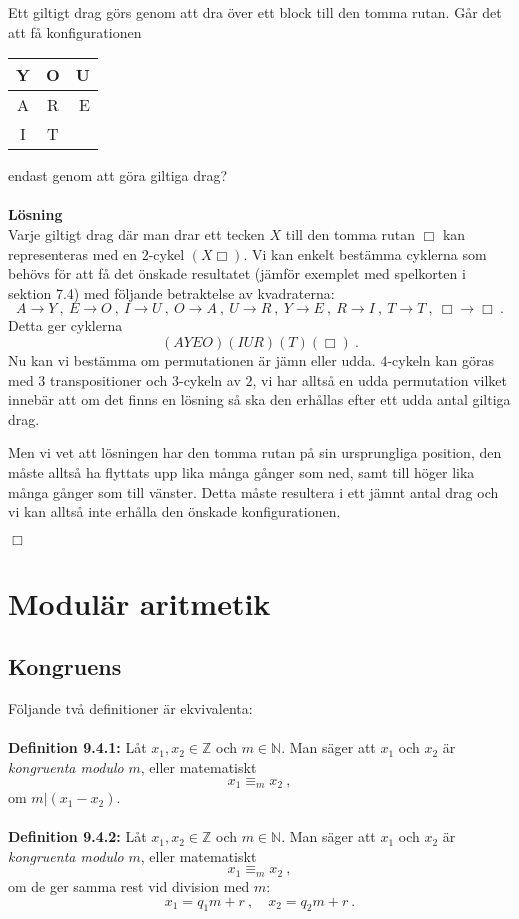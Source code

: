 \documentclass{article}
\begin{document}
Ett giltigt drag görs genom att dra över ett block till den tomma rutan. Går det att få konfigurationen
\begin{center}
\begin{tabular}{| c | c | r |}
\hline
Y & O & U
\\ \hline
A & R & E
\\ \hline
I & T &
\\ \hline
\end{tabular}
\end{center}
endast genom att göra giltiga drag?
\\ \\
\textbf{Lösning}
\\
Varje giltigt drag där man drar ett tecken $X$ till den tomma rutan $\Box$ kan representeras med en $2$-cykel $(X\Box)$. Vi kan enkelt bestämma cyklerna som behövs för att få det önskade resultatet (jämför exemplet med spelkorten i sektion 7.4) med följande betraktelse av kvadraterna:
$$
A\rightarrow Y \ , \ E\rightarrow O \ , \ I\rightarrow U \ , \ O\rightarrow A \ , \ U\rightarrow R \ , \ Y\rightarrow E \ , \ R\rightarrow I \ , \ T\rightarrow T \ , \ \Box\rightarrow\Box \ .  
$$
Detta ger cyklerna
$$
(AYEO)(IUR)(T)(\Box) \ .
$$
Nu kan vi bestämma om permutationen är jämn eller udda. $4$-cykeln kan göras med $3$ transpositioner och $3$-cykeln av $2$, vi har alltså en udda permutation vilket innebär att om det finns en lösning så ska den erhållas efter ett udda antal giltiga drag.

Men vi vet att lösningen har den tomma rutan på sin ursprungliga position, den måste alltså ha flyttats upp lika många gånger som ned, samt till höger lika många gånger som till vänster. Detta måste resultera i ett jämnt antal drag och vi kan alltså inte erhålla den önskade konfigurationen.
\begin{flushright}
$\Box$
\end{flushright}


\section{Modulär aritmetik}
\subsection{Kongruens}
Följande två definitioner är ekvivalenta:\\ \\
\textbf{Definition 9.4.1:} Låt $x_1,x_2\in\mathbb{Z}$ och $m\in\mathbb{N}$. Man säger att $x_1$ och $x_2$ är \textit{kongruenta modulo} $m$, eller matematiskt
$$
x_1\equiv_m x_2 \ ,
$$
om $m|(x_1-x_2)$.\\ \\
\textbf{Definition 9.4.2:} Låt $x_1,x_2\in\mathbb{Z}$ och $m\in\mathbb{N}$. Man säger att $x_1$ och $x_2$ är \textit{kongruenta modulo} $m$, eller matematiskt
$$
x_1\equiv_m x_2 \ ,
$$
om de ger samma rest vid division med $m$:
$$
x_1=q_1m+r \ , \quad x_2=q_2m+r \ .
$$
\end{document}
